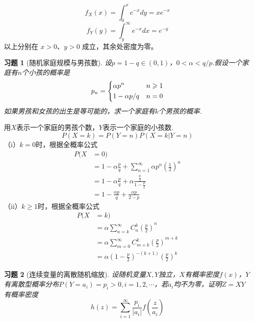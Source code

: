 \documentclass[12pt,fontset=fandol]{ctexart}
\newtheorem{exercise}{习题}[section]
\begin{document}
\begin{solve}\label{a:Y4.15}
\[{f_X}(x) = \int_0^x {{e^{ - x}}dy}  = x{e^{ - x}}\]
    \[{f_Y}(y) = \int_y^\infty  {{e^{ - x}}dx}  = {e^{ - y}}\]
 以上分别在 $x>0$、$y>0$ 成立，其余处密度为零。\end{solve}

\begin{exercise}[随机家庭规模与男孩数]\label{q:Y4.16}
设$p=1-q\in (0,1)$，$0<\alpha<q/p$.假设一个家庭有$n$个小孩的概率是
\[{p_n} = \left\{ \begin{gathered}
  \alpha {p^n} \hfill \quad n\geqslant 1\\
  1 - \alpha p/q \hfill \quad n=0\\ 
\end{gathered}  \right.\]
如果男孩和女孩的出生是等可能的，求一个家庭有$k$个男孩的概率.\par{}
\end{exercise}

\begin{solve}\label{a:Y4.16}
用$X$表示一个家庭的男孩个数，$Y$表示一个家庭的小孩数.    
\[P(X = k) = P(Y = n)P(X = k|Y = n)\]
    （i）$k=0$时，根据全概率公式
    \[\begin{aligned}P(X &= 0) \\&= 1 - \alpha \frac{p}{q} + {\sum\limits_{n = 1}^\infty  {\alpha {p^n}\left( {\frac{1}{2}} \right)} ^n} \\&= 1 - \alpha \frac{p}{q} + \alpha \frac{{\frac{p}{2}}}{{1 - \frac{p}{2}}} \\&= 1 - \frac{{\alpha p}}{q} + \frac{{\alpha p}}{{2 - p}}\end{aligned}\]
    （ii）$k\geqslant 1$时，根据全概率公式
    \[\begin{aligned}P(X &= k) \\&= \alpha {\sum\limits_{n = k}^\infty  {C_n^k\left( {\frac{p}{2}} \right)} ^n} \\&= \alpha {\sum\limits_{m = 0}^\infty  {C_{m + k}^k\left( {\frac{p}{2}} \right)} ^{m + k}} \\&= \alpha {\left( {1 - \frac{p}{2}} \right)^{ - (k + 1)}}{\left( {\frac{p}{2}} \right)^k}\end{aligned}\]
\end{solve}

\begin{exercise}[连续变量的离散随机缩放]\label{q:Y4.22}
设随机变量$X,Y$独立，$X$有概率密度$f(x)$，$Y$有离散型概率分布$P(Y=a_i)=p_i>0,i=1,2,\cdots$，若$a_i$均不为零，证明$Z=XY$有概率密度
\[h(z) = \sum\limits_{i = 1}^\infty  {\frac{{{p_i}}}{{|{a_i}|}}f\left( {\frac{z}{{{a_i}}}} \right)} \]\par{}
\end{exercise}
\end{document}
